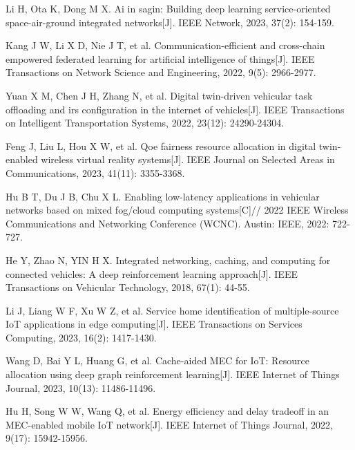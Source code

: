 
\begin{reflist}
\item[{[1]}] Li H, Ota K, Dong M X. Ai in sagin: Building deep learning
  service-oriented space-air-ground integrated networks[J]. IEEE Network,
  2023, 37(2): 154-159.
\item[{[2]}] Kang J W, Li X D, Nie J T, et al. Communication-efficient and
  cross-chain empowered federated learning for artificial intelligence of
  things[J]. IEEE Transactions on Network Science and Engineering, 2022, 9(5):
  2966-2977.
\item[{[3]}] Yuan X M, Chen J H, Zhang N, et al. Digital twin-driven vehicular
  task offloading and irs configuration in the internet of vehicles[J]. IEEE
  Transactions on Intelligent Transportation Systems, 2022, 23(12): 24290-24304.
\item[{[4]}] Feng J, Liu L, Hou X W, et al. Qoe fairness resource allocation in
  digital twin-enabled wireless virtual reality systems[J]. IEEE Journal on
  Selected Areas in Communications, 2023, 41(11): 3355-3368.
\item[{[5]}] Hu B T, Du J B, Chu X L. Enabling low-latency applications in
  vehicular networks based on mixed fog/cloud computing systems[C]// 2022 IEEE
  Wireless Communications and Networking Conference (WCNC). Austin: IEEE, 2022:
  722-727.
\item[{[6]}] He Y, Zhao N, YIN H X. Integrated networking, caching, and
  computing for connected vehicles: A deep reinforcement learning approach[J].
  IEEE Transactions on Vehicular Technology, 2018, 67(1): 44-55.
\item[{[7]}] Li J, Liang W F, Xu W Z, et al. Service home identification of
  multiple-source IoT applications in edge computing[J]. IEEE Transactions on
  Services Computing, 2023, 16(2): 1417-1430.
\item[{[8]}] Wang D, Bai Y L, Huang G, et al. Cache-aided MEC for IoT: Resource
  allocation using deep graph reinforcement learning[J]. IEEE Internet of
  Things Journal, 2023, 10(13): 11486-11496.
\item[{[9]}] Hu H, Song W W, Wang Q, et al. Energy efficiency and delay tradeoff
  in an MEC-enabled mobile IoT network[J]. IEEE Internet of Things Journal,
  2022, 9(17): 15942-15956.

\end{reflist}
